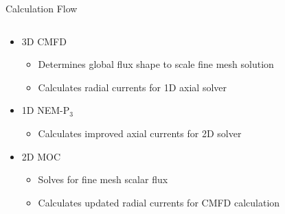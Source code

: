 
\begin{frame}[t]{Calculation Flow}

\begin{columns}
  \begin{column}{0.6\textwidth}
    \begin{itemize}
      \item 3D CMFD \cite{SmithCMFDOrig}
      \begin{itemize}
        \item Determines global flux shape to scale fine mesh solution
        \item Calculates radial currents for 1D axial solver
      \end{itemize}
      \item 1D NEM-P$_3$ \cite{SPnEquations,finnemann1977RodCuspingOrigMention}
      \begin{itemize}
        \item Calculates improved axial currents for 2D solver
      \end{itemize}
      \item 2D MOC \cite{AskerMOCOrig1972,HalsallMOCOrigCACTUS1980}
      \begin{itemize}
        \item Solves for fine mesh scalar flux
        \item Calculates updated radial currents for CMFD calculation
      \end{itemize}
    \end{itemize}
  \end{column}
\begin{column}{0.4\textwidth}
  \begin{figure}[h]
    \centering
    \resizebox{!}{0.7\textheight}{}
  \end{figure}
\end{column}
\end{columns}

\end{frame}


